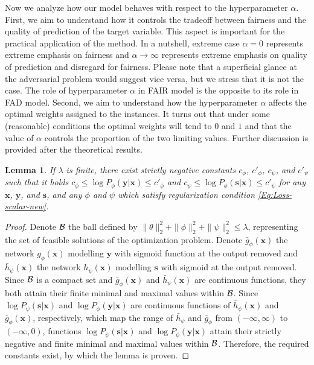 \documentclass[preprint,12pt]{elsarticle}
\newtheorem{lemma}{Lemma}
\begin{document}
Now we analyze how our model behaves with respect to the hyperparameter $\alpha$. First, we aim to understand how it controls the tradeoff between fairness and the quality of prediction of the target variable. This aspect is important for the practical application of the method. In a nutshell, extreme case $\alpha=0$ represents extreme emphasis on fairness and $\alpha\rightarrow\infty$ represents extreme emphasis on quality of prediction and disregard for fairness. Please note that a superficial glance at the adversarial problem would suggest vice versa, but we stress that it is not the case. The role of hyperparameter $\alpha$ in FAIR model is the opposite to its role in FAD model. Second, we aim to understand how the hyperparameter $\alpha$ affects the optimal weights assigned to the instances. It turns out that under some (reasonable) conditions the optimal weights will tend to $0$ and $1$ and that the value of $\alpha$ controls the proportion of the two limiting values. Further discussion is provided after the theoretical results.

\begin{lemma}
	If $\lambda$ is finite, there exist strictly negative constants
	$c_\phi$, $c'_\phi$, $c_\psi$, and $c'_\psi$ such that it holds
	$c_\phi\leq \log P_\phi(\mathbf{y}|\mathbf{x})\leq c'_\phi$ and
	$c_\psi\leq \log P_\phi(\mathbf{s}|\mathbf{x})\leq c'_\psi$ for
	any $\mathbf{x}$, $\mathbf{y}$, and $\mathbf{s}$, and any
	$\phi$ and $\psi$ which satisfy regularization condition \ref{Eq:Loss-scalar-new}.
	\label{pp:bounded}
\end{lemma}
\begin{proof}
	Denote ${\cal B}$ the ball defined by $\|\theta\|^2_2+\|\phi\|^2_2+\|\psi\|^2_2\leq \lambda$, representing the set of feasible solutions of the optimization problem.
	Denote $\bar{g}_\phi(\mathbf{x})$ the network $g_\phi(\mathbf{x})$ modelling $\mathbf{y}$ with sigmoid function at the output removed and $\bar{h}_\psi(\mathbf{x})$ the network $h_\psi(\mathbf{x})$ modelling $\mathbf{s}$ with sigmoid at the output removed. Since ${\cal B}$ is a compact set and $\bar{g}_\phi(\mathbf{x})$ and $\bar{h}_\psi(\mathbf{x})$ are continuous functions, they both attain their finite minimal and maximal values within ${\cal B}$. Since $\log P_\psi(\mathbf{s}|\mathbf{x})$ and $\log P_\phi(\mathbf{y}|\mathbf{x})$ are continuous functions of  $\bar{h}_\psi(\mathbf{x})$ and $\bar{g}_\phi(\mathbf{x})$, respectively, which map the range of $\bar{h}_\psi$ and $\bar{g}_\phi$ from $(-\infty,\infty)$ to $(-\infty, 0)$, functions $\log P_\psi(\mathbf{s}|\mathbf{x})$ and $\log P_\phi(\mathbf{y}|\mathbf{x})$ attain their strictly negative and finite minimal and maximal values within ${\cal B}$. Therefore, the required constants exist, by which the lemma is proven.
\end{proof}
\end{document}
